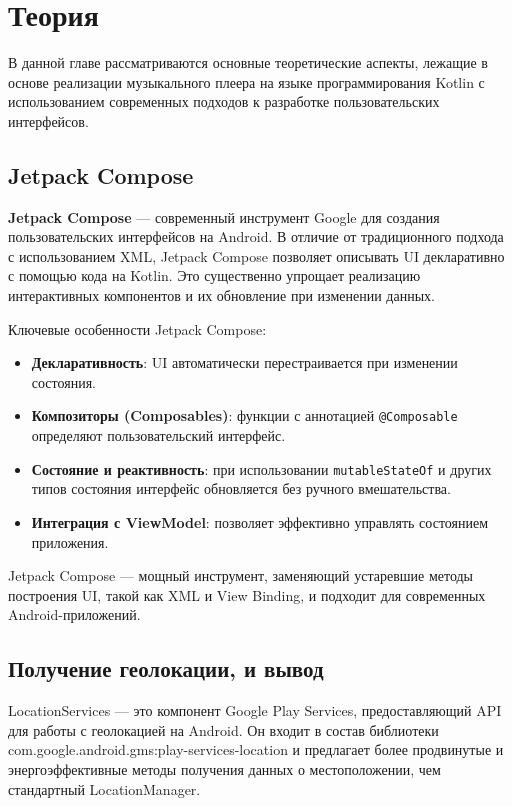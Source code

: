 \chapter{Теория}
\label{ch:chap1}
В данной главе рассматриваются основные теоретические аспекты, лежащие в основе реализации музыкального плеера на языке программирования Kotlin с использованием современных подходов к разработке пользовательских интерфейсов.

\section{Jetpack Compose}

\textbf{Jetpack Compose} — современный инструмент Google для создания пользовательских интерфейсов на Android. В отличие от традиционного подхода с использованием XML, Jetpack Compose позволяет описывать UI декларативно с помощью кода на Kotlin. Это существенно упрощает реализацию интерактивных компонентов и их обновление при изменении данных.

Ключевые особенности Jetpack Compose:

\begin{itemize}
    \item \textbf{Декларативность}: UI автоматически перестраивается при изменении состояния.
    \item \textbf{Композиторы (Composables)}: функции с аннотацией \texttt{@Composable} определяют пользовательский интерфейс.
    \item \textbf{Состояние и реактивность}: при использовании \texttt{mutableStateOf} и других типов состояния интерфейс обновляется без ручного вмешательства.
    \item \textbf{Интеграция с ViewModel}: позволяет эффективно управлять состоянием приложения.
\end{itemize}

Jetpack Compose — мощный инструмент, заменяющий устаревшие методы построения UI, такой как XML и View Binding, и подходит для современных Android-приложений.

\section{Получение геолокации, и вывод}

LocationServices — это компонент Google Play Services, предоставляющий API для работы с геолокацией на Android. Он входит в состав библиотеки com.google.android.gms:play-services-location и предлагает более продвинутые и энергоэффективные методы получения данных о местоположении, чем стандартный LocationManager.

